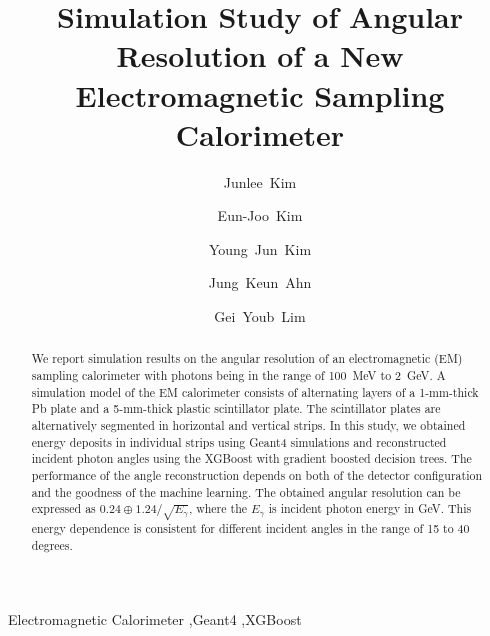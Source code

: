 \documentclass[preprint,12pt,times,a4paper]{elsarticle}
\begin{document}
\begin{frontmatter}

\setcounter{page}{0}
\title{Simulation Study of Angular Resolution of a New Electromagnetic Sampling Calorimeter}

\author[jbnu]{Junlee~Kim}

\author[jbnu]{Eun-Joo~Kim}

\author[korea]{Young~Jun~Kim}
\author[korea]{Jung~Keun~Ahn}
\author[kek]{Gei~Youb~Lim}

\address[jbnu]{Division of Science Education, Jeonbuk National University, Jeonju 54896, Korea}
\address[korea]{Department of Physics, Korea University, Seoul 02841, Korea}
\address[kek]{Institute of Particle and Nuclear Studies (IPNS), High Energy Accelerator Research Organization (KEK), Tsukuba 305-0801, Japan}


\begin{abstract}
We report simulation results on the angular resolution of an electromagnetic (EM) sampling calorimeter with photons being in the range of 100~MeV to 2~GeV. A simulation model of the EM calorimeter consists of alternating layers of a 1-mm-thick Pb plate and a 5-mm-thick plastic scintillator plate. The scintillator plates are alternatively segmented in horizontal and vertical strips. In this study, we obtained energy deposits in individual strips using Geant4 simulations and reconstructed incident photon angles using the XGBoost with gradient boosted decision trees. The performance of the angle reconstruction depends on both of the detector configuration and the goodness of the machine learning. The obtained angular resolution can be expressed as $0.24 \oplus 1.24/\sqrt{E_{\gamma}}$, where the $E_{\gamma}$ is incident photon energy in GeV. This energy dependence is consistent for different incident angles in the range of 15 to 40 degrees.

\end{abstract}
\begin{keyword}
Electromagnetic Calorimeter \sep Geant4 \sep XGBoost
\end{keyword}

\end{frontmatter}
\end{document}
